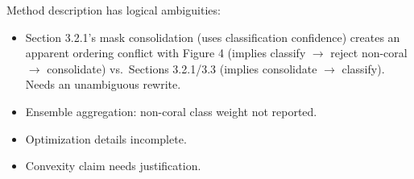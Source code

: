 \documentclass[12pt]{article}
\newenvironment{reviewercomment}{%
  \begin{mdframed}[backgroundcolor=gray!10,linecolor=gray!40,
                   leftmargin=0pt,rightmargin=0pt,
                   innerleftmargin=8pt,innerrightmargin=8pt,
                   innertopmargin=6pt,innerbottommargin=6pt]
  \itshape\color{quotegray}%
}{%
  \end{mdframed}%
}
\begin{document}
\begin{reviewercomment}
Method description has logical ambiguities:
\begin{itemize}
  \item Section 3.2.1's mask consolidation (uses classification confidence)
    creates an apparent ordering conflict with Figure 4 (implies classify
    $\to$ reject non-coral $\to$ consolidate) vs.\ Sections 3.2.1/3.3 (implies
    consolidate $\to$ classify).  Needs an unambiguous rewrite.
  \item Ensemble aggregation: non-coral class weight not reported.
  \item Optimization details incomplete.
  \item Convexity claim needs justification.
\end{itemize}
\end{reviewercomment}
\end{document}

